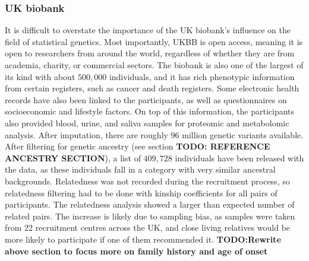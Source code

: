 \subsubsection{UK biobank}

It is difficult to overstate the importance of the UK biobank's influence on the field of statistical genetics. Most importantly, UKBB is open access, meaning it is open to researchers from around the world, regardless of whether they are from academia, charity, or commercial sectors\cite{bycroft2018uk,biobank2015genotyping}. The biobank is also one of the largest of its kind with about $ 500,000 $ individuals, and it has rich phenotypic information from certain registers, such as cancer and death registers. Some electronic health records have also been linked to the participants, as well as questionnaires on socioeconomic and lifestyle factors. On top of this information, the participants also provided blood, urine, and saliva samples for proteomic and metabolomic analysis.
After imputation\cite{marchini2010genotype}, there are roughly $ 96 $ million genetic variants available. After filtering for genetic ancestry (see section \textbf{TODO: REFERENCE ANCESTRY SECTION}), a list of $ 409,728 $ individuals have been released with the data, as these individuals fall in a category with very similar ancestral backgrounds. Relatedness was not recorded during the recruitment process, so relatedness filtering had to be done with kinship coefficients for all pairs of participants. The relatedness analysis showed a larger than expected number of related pairs. The increase is likely due to sampling bias, as samples were taken from 22 recruitment centres across the UK, and close living relatives would be more likely to participate if one of them recommended it.
\textbf{TODO:Rewrite above section to focus more on family history and age of onset}
